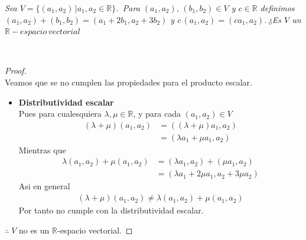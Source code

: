 \documentclass[11pt,letterpaper]{article}
\newcommand{\R}{\mathbb{R}}
\begin{document}
\begin{tcolorbox}[
	title = \textcolor{black}{\textcolor{white}{Problema 9}},]
\textit{Sea $V=\{(a_1,a_2)\,|a_1,a_2\in \mathbb{R}\}$. \,Para $(a_1,a_2),\,(b_1,b_2)\in V$ y $c\in \mathbb{R}$
definimos $(a_1,a_2)+(b_1,b_2)=(a_1+2b_1,a_2+3b_2)$ y $c\,(a_1,a_2)=(ca_1,a_2)$.\,¿Es $V$ un $\mathbb{R}-espacio\,vectorial$
}
\end{tcolorbox}\,\\
\begin{proof}\,\\
	Veamos que se no cumplen las propiedades para el producto escalar.
 	\begin{itemize}
		\item \textbf{Distributividad escalar}\\
		Pues para cualesquiera $\lambda,\mu\in\R$, y para cada $(a_1,a_2)\in V$
		\begin{align*}
			(\lambda+\mu)(a_1,a_2)&=((\lambda+\mu)a_1,a_2)\\
			&=(\lambda a_1+\mu a_1,a_2)
		\end{align*}
		Mientras que
		\begin{align*}
			\lambda(a_1,a_2)+\mu(a_1,a_2)&=(\lambda a_1,a_2)+(\mu a_1,a_2)\\
			&=(\lambda a_1+2\mu a_1,a_2+3\mu a_2)
		\end{align*}
		Asi en general
		\begin{align*}
			(\lambda+\mu)(a_1,a_2)\neq\lambda(a_1,a_2)+\mu(a_1,a_2)
		\end{align*}
		Por tanto no cumple con la distributividad escalar.\\
	\end{itemize}
	$\therefore\; V$ no es un $\R$-espacio vectorial.
\end{proof}\,\\
\end{document}
